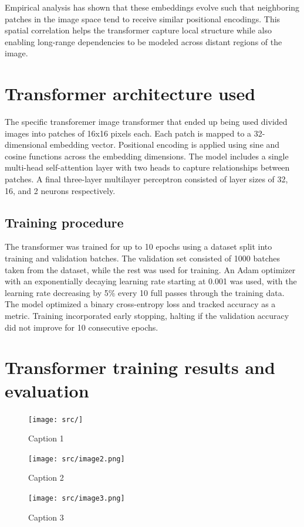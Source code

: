 \documentclass{pracalicmgr}
\begin{document}
Empirical analysis has shown that these embeddings evolve such that neighboring patches in the image space tend to receive similar positional encodings. This spatial correlation helps the transformer capture local structure while also enabling long-range dependencies to be modeled across distant regions of the image.


\section{Transformer architecture used}

The specific transforemer image transformer that ended up being used divided images into patches of 16x16 pixels each. Each patch is mapped to a 32-dimensional embedding vector. Positional encoding is applied using sine and cosine functions across the embedding dimensions. The model includes a single multi-head self-attention layer with two heads to capture relationships between patches. A final three-layer multilayer perceptron consisted of layer sizes of 32, 16, and 2 neurons respectively.

\subsection{Training procedure}

The transformer was trained for up to 10 epochs using a dataset split into training and validation batches. The validation set consisted of 1000 batches taken from the dataset, while the rest was used for training. An Adam optimizer with an exponentially decaying learning rate starting at 0.001 was used, with the learning rate decreasing by 5\% every 10 full passes through the training data. The model optimized a binary cross-entropy loss and tracked accuracy as a metric. Training incorporated early stopping, halting if the validation accuracy did not improve for 10 consecutive epochs.

\section{Transformer training results and evaluation}

\begin{figure}[H]
    \centering
    \begin{minipage}[t]{0.48\textwidth}
        \centering
        \texttt{[image: src/]}
        \caption{Caption 1}
        \label{fig:img1}
    \end{minipage}
    \hfill
    \begin{minipage}[t]{0.48\textwidth}
        \centering
        \texttt{[image: src/image2.png]}
        \caption{Caption 2}
        \label{fig:img2}
    \end{minipage}
    
    \vspace{1cm}
    
    \begin{minipage}[t]{0.6\textwidth}
        \centering
        \texttt{[image: src/image3.png]}
        \caption{Caption 3}
        \label{fig:img3}
    \end{minipage}
\end{figure}
\end{document}
